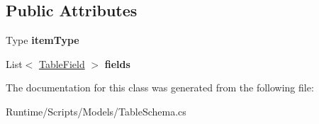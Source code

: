 \subsection*{Public Attributes}
\begin{DoxyCompactItemize}
\item 
\mbox{\label{class_d_g_tools_1_1_database_1_1_table_schema_a3cc723edc7ac15e5fa29facca4ec5550}} 
Type {\bfseries item\+Type}
\item 
\mbox{\label{class_d_g_tools_1_1_database_1_1_table_schema_a882e5694b7c520b9af80613efb67e68e}} 
List$<$ \mbox{\hyperlink{class_d_g_tools_1_1_database_1_1_table_field}{Table\+Field}} $>$ {\bfseries fields}
\end{DoxyCompactItemize}


The documentation for this class was generated from the following file\+:\begin{DoxyCompactItemize}
\item 
Runtime/\+Scripts/\+Models/Table\+Schema.\+cs\end{DoxyCompactItemize}
